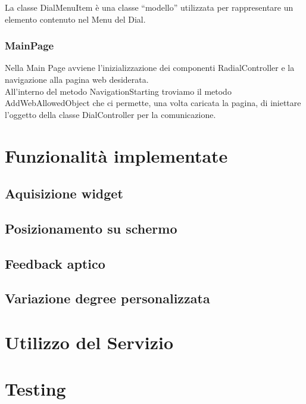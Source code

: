 La classe DialMenuItem è una classe “modello” utilizzata per rappresentare un elemento contenuto nel Menu del Dial.

\subsubsection{MainPage}

Nella Main Page avviene l’inizializzazione dei componenti RadialController e la navigazione alla pagina web desiderata.\\

All’interno del metodo NavigationStarting troviamo il metodo AddWebAllowedObject che ci permette, una volta caricata la pagina, di iniettare l’oggetto della classe DialController per la comunicazione.

\section{Funzionalità implementate}

\subsection{Aquisizione widget}
\subsection{Posizionamento su schermo}
\subsection{Feedback aptico}
\subsection{Variazione degree personalizzata}
\section{Utilizzo del Servizio}
\section{Testing}